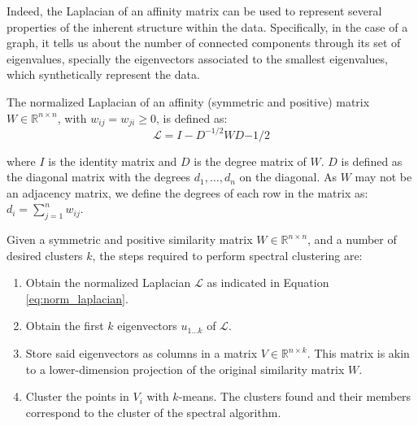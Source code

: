 %

Indeed, the Laplacian of an affinity matrix can be used to represent several properties of the inherent structure within the data. Specifically, in the case of a graph, it tells us about the number of connected components through its  set of eigenvalues, specially the eigenvectors associated to the smallest eigenvalues, which synthetically represent the data.

The normalized Laplacian of an affinity (symmetric and positive) matrix $W\in \mathbb{R}^{n\times n}$, with $w_{ij} = w_{ji} \geq 0$, is defined as: 
\begin{equation}\label{eq:norm_laplacian}
\mathcal{L} = I - D^{-1/2}WD{-1/2}
\end{equation}

where $I$ is the identity matrix and $D$ is the degree matrix of $W$. $D$ is defined as the diagonal matrix with the degrees $d_1 ,\dots,d_n$ on the diagonal. As $W$ may not be an adjacency matrix, we define the degrees of each row in the matrix as: $d_i=\sum_{j=1}^{n}{w_{ij}}$.

Given a  symmetric and positive similarity matrix $W \in \mathbb{R}^{n \times n}$, and a number of desired clusters $k$, the steps required to perform spectral clustering are:

\begin{enumerate}
\item Obtain the normalized Laplacian $\mathcal{L}$ as indicated in Equation \ref{eq:norm_laplacian}.
\item Obtain the first $k$ eigenvectors $u_{1\dots k}$ of $\mathcal{L}$.
\item Store said eigenvectors as columns in a matrix $V \in \mathbb{R}^{n \times k}$. This matrix is akin to a lower-dimension projection of the original similarity matrix $W$.
\item Cluster the points in $V_i$ with $k$-means. The clusters found and their members correspond to the cluster of the spectral algorithm.
\end{enumerate}


